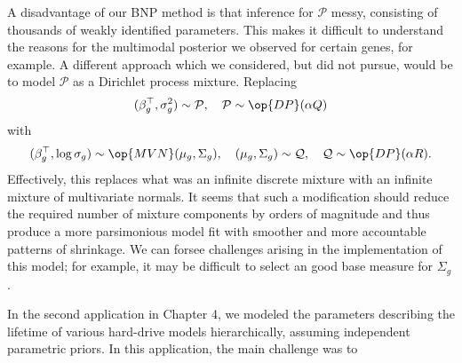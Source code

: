 A disadvantage of our BNP method is that inference for $\mathcal{P}$ messy, consisting of thousands of weakly identified parameters. This makes it difficult to understand the reasons for the multimodal posterior we observed for certain genes, for example. A different approach which we considered, but did not pursue, would be to model $\mathcal{P}$ as a Dirichlet process mixture. Replacing
\begin{equation*}
(\beta_g^\top,\sigma^2_g) \sim \mathcal{P},\quad \mathcal{P} \sim \op{DP}(\alpha Q)
\end{equation*}
with
\begin{equation*}
(\beta_g^\top,\log \sigma_g) \sim \op{MVN}(\mu_g, \Sigma_g),\quad (\mu_g,\Sigma_g) \sim \mathcal{Q},\quad \mathcal{Q} \sim \op{DP}(\alpha R).
\end{equation*}
Effectively, this replaces what was an infinite discrete mixture with an infinite mixture of multivariate normals. It seems that such a modification should reduce the required number of mixture components by orders of magnitude and thus produce a more parsimonious model fit with smoother and more accountable patterns of shrinkage. We can forsee challenges arising in the implementation of this model; for example, it may be difficult to select an good base measure for $\Sigma_g$.

In the second application in Chapter 4, we modeled the parameters describing the lifetime of various hard-drive models hierarchically, assuming independent parametric priors. In this application, the main challenge was to 